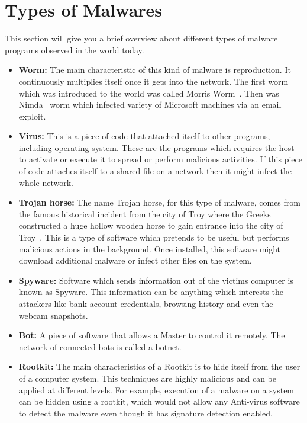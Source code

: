 \documentclass[11pt]{article}
\begin{document}
	\section{Types of Malwares}
	This section will give you a brief overview about different types of malware programs observed in the world today. 
	\begin{itemize}
	\item\textbf{Worm:} 
	The main characteristic of this kind of malware is reproduction. It continuously multiplies itself once it gets into the network. The first worm which was introduced to the world was called Morris Worm~\cite{spafford1989internet}. Then was Nimda~\cite{machie2001nimda} worm which infected variety of Microsoft machines via an email exploit. 
	\item\textbf{Virus:}
	This is a piece of code that attached itself to other programs, including operating system. These are the programs which requires the host to activate or execute it to spread or perform malicious activities. If this piece of code attaches itself to a shared file on a network then it might infect the whole network.
	\item\textbf{Trojan horse:}
	The name Trojan horse, for this type of malware, comes from the famous historical incident from the city of Troy where the Greeks constructed a huge hollow wooden horse to gain entrance into the city of Troy~\cite{trojanhorse}. This is a type of software which pretends to be useful but performs malicious actions in the background. Once installed, this software might download additional malware or infect other files on the system.
	\item\textbf{Spyware:}
	Software which sends information out of the victims computer is known as Spyware. This information can be anything which interests the attackers like bank account credentials, browsing history and even the webcam snapshots.
	\item\textbf{Bot:}
	A piece of software that allows a Master to control it remotely. The network of connected bots is called a botnet.
	\item\textbf{Rootkit:}
	The main characteristics of a Rootkit is to hide itself from the user of a computer system. This techniques are highly malicious and can be applied at different levels. For example, execution of a malware on a system can be hidden using a rootkit, which would not allow any Anti-virus software to detect the malware even though it has signature detection enabled.
	\end{itemize}
	
\end{document}
